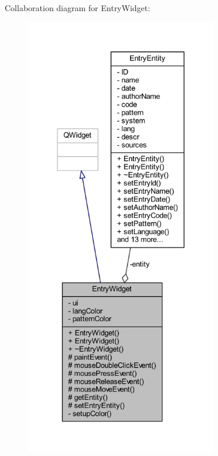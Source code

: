 Collaboration diagram for Entry\+Widget\+:
\nopagebreak
\begin{figure}[H]
\begin{center}
\leavevmode
\includegraphics[height=550pt]{class_entry_widget__coll__graph}
\end{center}
\end{figure}
